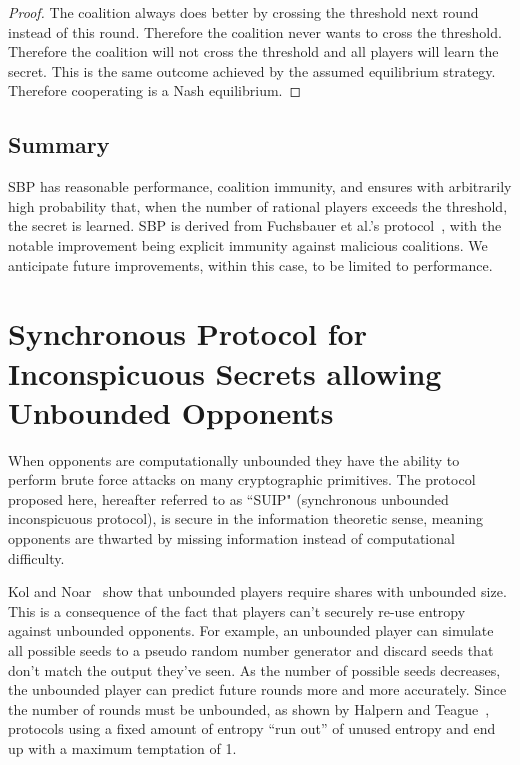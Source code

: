 \documentclass[12pt]{dalcsthesis}
\begin{document}
\begin{proof}
The coalition always does better by crossing the threshold next round instead of this round. Therefore the coalition never wants to cross the threshold. Therefore the coalition will not cross the threshold and all players will learn the secret. This is the same outcome achieved by the assumed equilibrium strategy. Therefore cooperating is a Nash equilibrium.
\end{proof}


\subsection{Summary}

SBP has reasonable performance, coalition immunity, and ensures with arbitrarily high probability that, when the number of rational players exceeds the threshold, the secret is learned. SBP is derived from Fuchsbauer et al.'s protocol~\cite{fuch10}, with the notable improvement being explicit immunity against malicious coalitions. We anticipate future improvements, within this case, to be limited to performance.



\section{Synchronous Protocol for Inconspicuous Secrets allowing Unbounded Opponents}

When opponents are computationally unbounded they have the ability to perform brute force attacks on many cryptographic primitives. The protocol proposed here, hereafter referred to as ``SUIP" (synchronous unbounded inconspicuous protocol), is secure in the information theoretic sense, meaning opponents are thwarted by missing information instead of computational difficulty.

Kol and Noar~\cite{kol08} show that unbounded players require shares with unbounded size. This is a consequence of the fact that players can't securely re-use entropy against unbounded opponents. For example, an unbounded player can simulate all possible seeds to a pseudo random number generator and discard seeds that don't match the output they've seen. As the number of possible seeds decreases, the unbounded player can predict future rounds more and more accurately. Since the number of rounds must be unbounded, as shown by Halpern and Teague~\cite{halpern04}, protocols using a fixed amount of entropy ``run out'' of unused entropy and end up with a maximum temptation of 1.
\end{document}
